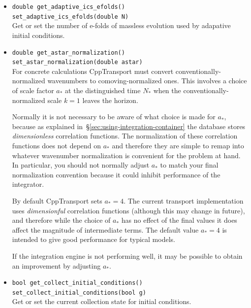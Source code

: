 \documentclass[11pt,a4paper]{article}
\newcommand{\Nstar}{N_{\ast}}
\newcommand{\astar}{a_{\ast}}
\newcommand{\packagefont}{\sffamily}
\newcommand{\CppTransport}{{\packagefont CppTransport}}
\begin{document}
\begin{itemize}
    \item \texttt{double get_adaptive_ics_efolds()} \\
    \texttt{set_adaptive_ics_efolds(double N)} \\
    Get or set the number of e-folds of massless evolution used by adapative
    initial conditions.
    
    \item \texttt{double get_astar_normalization()} \\
    \texttt{set_astar_normalization(double astar)} \\
    For concrete calculations {\CppTransport} must convert conventionally-normalized
    wavenumbers to comoving-normalized ones.
    This involves a choice of scale factor $\astar$ at the distinguished
    time $\Nstar$ when the conventionally-normalized scale $k=1$ leaves the
    horizon.

    Normally it is not necessary to be aware of what choice is made for
    $\astar$, because as explained in~\S\ref{sec:using-integration-container}
    the database stores \emph{dimensionless} correlation functions.
    The normalization of these correlation functions does not depend on
    $\astar$
    and therefore they are simple to remap into whatever wavenumber
    normalization is convenient for the problem at hand. In particular, you should
    not normally adjust $\astar$
    to match your final normalization convention because it could inhibit
    performance of the integrator.
     
    By default {\CppTransport} sets
    $\astar = 4$.
    The current transport implementation uses
    \emph{dimensionful} correlation
    functions (although this may change in future),
    and therefore while the choice of $\astar$ has no effect
    of the final values it does affect the magnitude of intermediate
    terms.
    The default value $\astar = 4$ is intended to give good performance
    for typical models.
    
    If the integration engine is not performing well, it may be possible
    to obtain an improvement by adjusting $\astar$.
    
    \item \texttt{bool get_collect_initial_conditions()} \\
    \texttt{set_collect_initial_conditions(bool g)} \\
    Get or set the current collection state for initial conditions.
    

\end{itemize}
\end{document}
